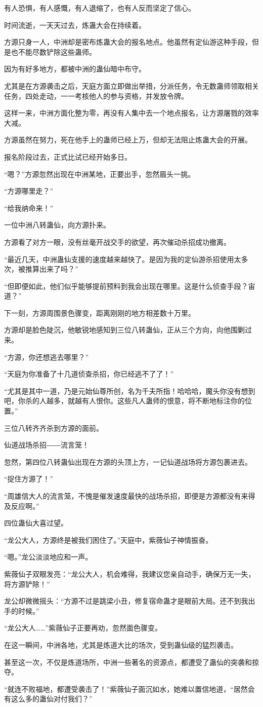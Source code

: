 \begin{this_body}
有人恐惧，有人感慨，有人退缩了，也有人反而坚定了信心。

时间流逝，一天天过去，炼蛊大会在持续着。

方源只身一人，中洲却是密布炼蛊大会的报名地点。他虽然有定仙游这种手段，但是也不能尽数铲除这些蛊师。

因为有好多地方，都被中洲的蛊仙暗中布守。

尤其是在方源袭击之后，天庭方面立即做出举措，分派任务，令无数蛊师领取相关任务，四处走动，一一考核他人的参与资格，并发放令牌。

这样一来，中洲方面化整为零，再没有人集中去一个地点报名，让方源屠戮的效率大减。

方源虽然在努力，死在他手上的蛊师已经上万，但却无法阻止炼蛊大会的开展。

报名阶段过去，正式比试已经开始多日。

“嗯？”方源忽然出现在中洲某地，正要出手，忽然眉头一挑。

“方源哪里走？”

“给我纳命来！”

一位中洲八转蛊仙，向方源扑来。

方源看了对方一眼，没有丝毫开战交手的欲望，再次催动杀招成功撤离。

“最近几天，中洲蛊仙支援的速度越来越快了。是因为我的定仙游杀招使用太多次，被推算出来了吗？”

“但即便如此，他们似乎能够提前预料到我会出现在哪里。这是什么侦查手段？宙道？”

下一刻，方源周围景色骤变，距离刚刚的地方相差数十万里。

方源却是脸色陡沉，他敏锐地感知到三位八转蛊仙，正从三个方向，向他围剿过来。

“方源，你还想逃去哪里？”

“天庭为你准备了十几道侦查杀招，你已经逃不了了！”

“尤其是其中一道，乃是元始仙尊所创，名为千夫所指！哈哈哈，魔头你没有想到吧，你杀的人越多，就越有人恨你。这些凡人蛊师的恨意，将不断地标注你的位置。”

三位八转齐齐杀到方源的面前。

仙道战场杀招――流言笼！

忽然，第四位八转蛊仙出现在方源的头顶上方，一记仙道战场将方源包裹进去。

“捉住方源了！”

“周雄信大人的流言笼，不愧是催发速度最快的战场杀招，即便是方源都没有来得及反应啊。”

四位蛊仙大喜过望。

“龙公大人，方源终是被我们困住了。”天庭中，紫薇仙子神情振奋。

“嗯。”龙公淡淡地应和一声。

紫薇仙子双眼发亮：“龙公大人，机会难得，我建议您亲自动手，确保万无一失，将方源铲除！”

龙公却微微摇头：“方源不过是跳梁小丑，修复宿命蛊才是眼前大局。还不到我出手的时候。”

“龙公大人……”紫薇仙子正要再劝，忽然面色骤变。

在这一瞬间，中洲各地，尤其是炼道大比的场次，受到蛊仙级的猛烈袭击。

甚至这一次，不仅是炼道场所，中洲一些著名的资源点，都遭受了蛊仙的突袭和掠夺。

“就连不败福地，都遭受袭击了！”紫薇仙子面沉如水，她难以置信地道，“居然会有这么多的蛊仙对付我们？”

\end{this_body}


